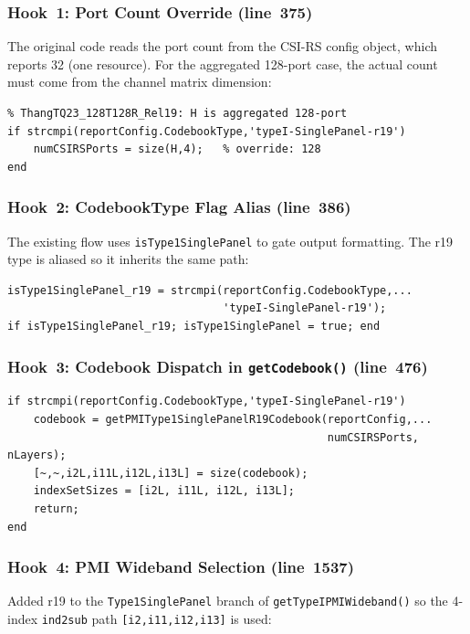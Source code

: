 \documentclass[11pt,a4paper]{article}
\begin{document}
\subsubsection{Hook~1: Port Count Override (line~375)}

The original code reads the port count from the CSI-RS config object, which
reports 32 (one resource). For the aggregated 128-port case, the actual count
must come from the channel matrix dimension:

\begin{lstlisting}
% ThangTQ23_128T128R_Rel19: H is aggregated 128-port
if strcmpi(reportConfig.CodebookType,'typeI-SinglePanel-r19')
    numCSIRSPorts = size(H,4);   % override: 128
end
\end{lstlisting}

\subsubsection{Hook~2: CodebookType Flag Alias (line~386)}

The existing flow uses \texttt{isType1SinglePanel} to gate output formatting.
The r19 type is aliased so it inherits the same path:

\begin{lstlisting}
isType1SinglePanel_r19 = strcmpi(reportConfig.CodebookType,...
                                 'typeI-SinglePanel-r19');
if isType1SinglePanel_r19; isType1SinglePanel = true; end
\end{lstlisting}

\subsubsection{Hook~3: Codebook Dispatch in \texttt{getCodebook()} (line~476)}

\begin{lstlisting}
if strcmpi(reportConfig.CodebookType,'typeI-SinglePanel-r19')
    codebook = getPMIType1SinglePanelR19Codebook(reportConfig,...
                                                 numCSIRSPorts, nLayers);
    [~,~,i2L,i11L,i12L,i13L] = size(codebook);
    indexSetSizes = [i2L, i11L, i12L, i13L];
    return;
end
\end{lstlisting}

\subsubsection{Hook~4: PMI Wideband Selection (line~1537)}

Added r19 to the \texttt{Type1SinglePanel} branch of
\texttt{getTypeIPMIWideband()} so the 4-index \texttt{ind2sub} path
\texttt{[i2,i11,i12,i13]} is used:
\end{document}
